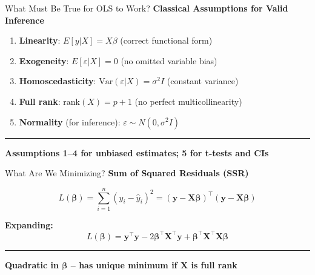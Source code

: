 \documentclass[8pt,aspectratio=169]{beamer}
\newcommand{\bottomnote}[1]{%
\vfill
\vspace{-2mm}
\textcolor{mllavender2}{\rule{\textwidth}{0.4pt}}
\vspace{1mm}
\footnotesize
\textbf{#1}
}
\begin{document}
\begin{frame}[t]{What Must Be True for OLS to Work?}
  \textbf{Classical Assumptions for Valid Inference}

  \begin{enumerate}
    \item \textbf{Linearity}: $E[y|X] = X\beta$ (correct functional form)
    \item \textbf{Exogeneity}: $E[\varepsilon|X] = 0$ (no omitted variable bias)
    \item \textbf{Homoscedasticity}: $\text{Var}(\varepsilon|X) = \sigma^2 I$ (constant variance)
    \item \textbf{Full rank}: $\text{rank}(X) = p+1$ (no perfect multicollinearity)
    \item \textbf{Normality} (for inference): $\varepsilon \sim N(0, \sigma^2 I)$
  \end{enumerate}

  \bottomnote{Assumptions 1--4 for unbiased estimates; 5 for t-tests and CIs}
\end{frame}

\begin{frame}[t]{What Are We Minimizing?}
  \textbf{Sum of Squared Residuals (SSR)}

  \begin{equation}
    L(\boldsymbol{\beta}) = \sum_{i=1}^{n} (y_i - \hat{y}_i)^2 = (\mathbf{y} - \mathbf{X}\boldsymbol{\beta})^\top (\mathbf{y} - \mathbf{X}\boldsymbol{\beta})
  \end{equation}

  \textbf{Expanding:}
  \begin{equation}
    L(\boldsymbol{\beta}) = \mathbf{y}^\top\mathbf{y} - 2\boldsymbol{\beta}^\top\mathbf{X}^\top\mathbf{y} + \boldsymbol{\beta}^\top\mathbf{X}^\top\mathbf{X}\boldsymbol{\beta}
  \end{equation}

  \bottomnote{Quadratic in $\boldsymbol{\beta}$ -- has unique minimum if $\mathbf{X}$ is full rank}
\end{frame}
\end{document}
